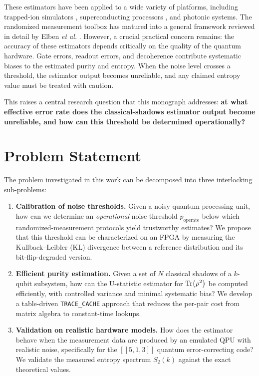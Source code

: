 \documentclass[12pt,a4paper,oneside]{book}
\theoremstyle{plain}
\theoremstyle{definition}
\theoremstyle{remark}
\begin{document}
These estimators have been applied to a wide variety of platforms, including trapped-ion simulators \cite{brydges2019probing}, superconducting processors \cite{elben2021many}, and photonic systems. The randomized measurement toolbox has matured into a general framework reviewed in detail by Elben \textit{et al.} \cite{elben2023toolbox}. However, a crucial practical concern remains: the accuracy of these estimators depends critically on the quality of the quantum hardware. Gate errors, readout errors, and decoherence contribute systematic biases to the estimated purity and entropy. When the noise level crosses a threshold, the estimator output becomes unreliable, and any claimed entropy value must be treated with caution.

This raises a central research question that this monograph addresses: \textbf{at what effective error rate does the classical-shadows estimator output become unreliable, and how can this threshold be determined operationally?}

\section{Problem Statement}
\label{sec:problem}

The problem investigated in this work can be decomposed into three interlocking sub-problems:

\begin{enumerate}[label=\textbf{P\arabic*:}, itemsep=3pt]
    \item \textbf{Calibration of noise thresholds.} Given a noisy quantum processing unit, how can we determine an \emph{operational} noise threshold $p_{\text{operate}}$ below which randomized-measurement protocols yield trustworthy estimates? We propose that this threshold can be characterized on an FPGA by measuring the Kullback--Leibler (KL) divergence between a reference distribution and its bit-flip-degraded version.
    \item \textbf{Efficient purity estimation.} Given a set of $N$ classical shadows of a $k$-qubit subsystem, how can the U-statistic estimator for $\Tr(\rho^2)$ be computed efficiently, with controlled variance and minimal systematic bias? We develop a table-driven \texttt{TRACE\_CACHE} approach that reduces the per-pair cost from matrix algebra to constant-time lookups.
    \item \textbf{Validation on realistic hardware models.} How does the estimator behave when the measurement data are produced by an emulated QPU with realistic noise, specifically for the $[[5,1,3]]$ quantum error-correcting code? We validate the measured entropy spectrum $S_2(k)$ against the exact theoretical values.
\end{enumerate}
\end{document}
